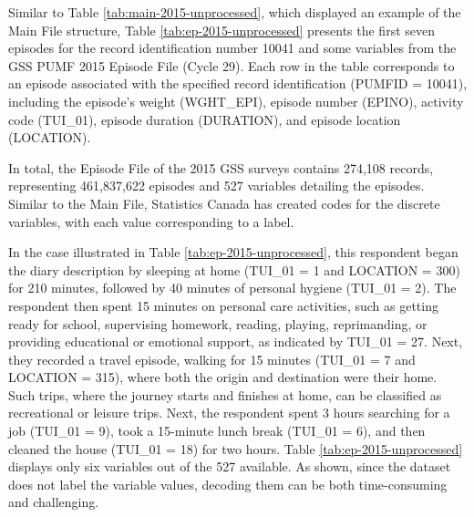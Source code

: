 \documentclass[Royal,times,sageh]{sagej}
\begin{document}
Similar to Table \ref{tab:main-2015-unprocessed}, which displayed an
example of the Main File structure, Table \ref{tab:ep-2015-unprocessed}
presents the first seven episodes for the record identification number
10041 and some variables from the GSS PUMF 2015 Episode File (Cycle 29).
Each row in the table corresponds to an episode associated with the
specified record identification (PUMFID = 10041), including the
episode's weight (WGHT\_EPI), episode number (EPINO), activity code
(TUI\_01), episode duration (DURATION), and episode location (LOCATION).

In total, the Episode File of the 2015 GSS surveys contains 274,108
records, representing 461,837,622 episodes and 527 variables detailing
the episodes. Similar to the Main File, Statistics Canada has created
codes for the discrete variables, with each value corresponding to a
label.

In the case illustrated in Table \ref{tab:ep-2015-unprocessed}, this
respondent began the diary description by sleeping at home (TUI\_01 = 1
and LOCATION = 300) for 210 minutes, followed by 40 minutes of personal
hygiene (TUI\_01 = 2). The respondent then spent 15 minutes on personal
care activities, such as getting ready for school, supervising homework,
reading, playing, reprimanding, or providing educational or emotional
support, as indicated by TUI\_01 = 27. Next, they recorded a travel
episode, walking for 15 minutes (TUI\_01 = 7 and LOCATION = 315), where
both the origin and destination were their home. Such trips, where the
journey starts and finishes at home, can be classified as recreational
or leisure trips. Next, the respondent spent 3 hours searching for a job
(TUI\_01 = 9), took a 15-minute lunch break (TUI\_01 = 6), and then
cleaned the house (TUI\_01 = 18) for two hours. Table
\ref{tab:ep-2015-unprocessed} displays only six variables out of the 527
available. As shown, since the dataset does not label the variable
values, decoding them can be both time-consuming and challenging.

\begingroup\fontsize{8}{10}\selectfont
\end{document}

